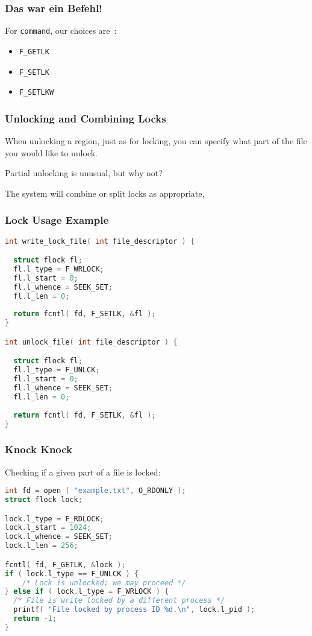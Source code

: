 \begin{frame}
	\frametitle{Das war ein Befehl!}

	For \texttt{command}, our choices are~\cite{apunix}:
	\begin{itemize}
		\item \texttt{F\_GETLK}
		\item \texttt{F\_SETLK}
		\item \texttt{F\_SETLKW}
	\end{itemize}

\end{frame}


\begin{frame}
	\frametitle{Unlocking and Combining Locks}

	When unlocking a region, just as for locking, you can specify what part of the file you would like to unlock.

	Partial unlocking is unusual, but why not?

	The system will combine or split locks as appropriate,


\end{frame}

\begin{frame}[fragile]
	\frametitle{Lock Usage Example}

	\begin{lstlisting}[language=C]
int write_lock_file( int file_descriptor ) {

  struct flock fl;
  fl.l_type = F_WRLOCK;
  fl.l_start = 0;
  fl.l_whence = SEEK_SET;
  fl.l_len = 0;
  
  return fcntl( fd, F_SETLK, &fl );
}

int unlock_file( int file_descriptor ) {

  struct flock fl;
  fl.l_type = F_UNLCK;
  fl.l_start = 0;
  fl.l_whence = SEEK_SET;
  fl.l_len = 0;
  
  return fcntl( fd, F_SETLK, &fl );
}
\end{lstlisting}


\end{frame}

\begin{frame}[fragile]
	\frametitle{Knock Knock}

	Checking if a given part of a file is locked:


	\begin{lstlisting}[language=C]
int fd = open ( "example.txt", O_RDONLY );
struct flock lock;

lock.l_type = F_RDLOCK;
lock.l_start = 1024;
lock.l_whence = SEEK_SET;
lock.l_len = 256;

fcntl( fd, F_GETLK, &lock );
if ( lock.l_type == F_UNLCK ) {
	/* Lock is unlocked; we may proceed */
} else if ( lock.l_type = F_WRLOCK ) {
  /* File is write locked by a different process */
  printf( "File locked by process ID %d.\n", lock.l_pid );
  return -1;
}
\end{lstlisting}

\end{frame}


